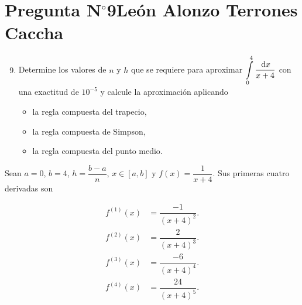 \section{Pregunta N$^{\circ}$9\qquad León Alonzo Terrones Caccha}

\begin{frame}
    \begin{enumerate}\setcounter{enumi}{8}
        \item

              Determine los valores de $n$ y $h$ que se requiere para
              aproximar
              \begin{math}
                  \displaystyle
                  \int\limits_{0}^{4}
                  \dfrac{\dl x}{x+4}
              \end{math}
              con una exactitud de $10^{-5}$ y calcule la
              aproximación aplicando

              \begin{itemize}
                  \item

                        la regla compuesta del trapecio,

                  \item

                        la regla compuesta de Simpson,

                  \item

                        la regla compuesta del punto medio.
              \end{itemize}
    \end{enumerate}

    \begin{solution}
        Sean $a=0$, $b=4$, $h=\dfrac{b-a}{n}$, $x\in\left[a,b\right]$
        y
        \begin{math}
            f\left(x\right)=
            \dfrac{1}{x+4}
        \end{math}.
        Sus primeras cuatro derivadas son

        \begin{align*}
            f^{\left(1\right)}\left(x\right) &
            =\dfrac{-1}{{\left(x+4\right)}^{2}}. \\
            f^{\left(2\right)}\left(x\right) &
            =\dfrac{2}{{\left(x+4\right)}^{3}}.  \\
            f^{\left(3\right)}\left(x\right) &
            =\dfrac{-6}{{\left(x+4\right)}^{4}}. \\
            f^{\left(4\right)}\left(x\right) &
            =\dfrac{24}{{\left(x+4\right)}^{5}}.
        \end{align*}
    \end{solution}
\end{frame}

